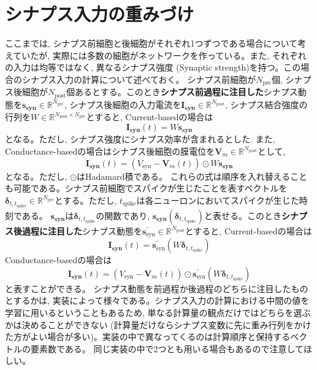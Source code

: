 \section{シナプス入力の重みづけ
}
ここまでは, シナプス前細胞と後細胞がそれぞれ1つずつである場合について考えていたが, 実際には多数の細胞がネットワークを作っている。また, それぞれの入力は均等ではなく, 異なるシナプス強度 (Synaptic strength)を持つ。この場合のシナプス入力の計算について述べておく。
シナプス前細胞が$N_{\text{pre}}$個, シナプス後細胞が$N_{\text{post}}$個あるとする。このとき\textbf{シナプス前過程に注目した}シナプス動態を$\boldsymbol{s_{\text{syn}}}\in \mathbb{R}^{N_{\text{pre}}}$, シナプス後細胞の入力電流を$\boldsymbol{I_{\text{syn}}}\in \mathbb{R}^{N_{\text{post}}}$, シナプス結合強度の行列を$W\in \mathbb{R}^{N_{\text{post}} \times N_{\text{pre}}}$とすると, Current-basedの場合は
\begin{equation}
\boldsymbol{I_{\text{syn}}}(t)=W \boldsymbol{s_{\text{syn}}}  
\end{equation}
となる。ただし, シナプス強度にシナプス効率が含まれるとした. また, Conductance-basedの場合はシナプス後細胞の膜電位を$\boldsymbol{V}_{m}\in \mathbb{R}^{N_{\text{post}}}$として, 
\begin{equation}
\boldsymbol{I_{\text{syn}}}(t)=\left(V_{\text{syn}}-\boldsymbol{V}_{m}(t)\right)\odot W \boldsymbol{s_{\text{syn}}}
\end{equation}
となる。ただし, $\odot$はHadamard積である。
これらの式は順序を入れ替えることも可能である。シナプス前細胞でスパイクが生じたことを表すベクトルを$\boldsymbol{\delta}_{t,t_{\text{spike}}}\in \mathbb{R}^{N_{\text{pre}}}$とする。ただし, $t_{\text{spike}}$は各ニューロンにおいてスパイクが生じた時刻である。 $\boldsymbol{s_{\text{syn}}}$は$\boldsymbol{\delta}_{t,t_{\text{spike}}}$の関数であり, $\boldsymbol{s_{\text{syn}}}(\boldsymbol{\delta}_{t,t_{\text{spike}}})$と表せる。このとき\textbf{シナプス後過程に注目した}シナプス動態を$\boldsymbol{s}^\prime_{\text{syn}}\in \mathbb{R}^{N_{\text{post}}}$とすると, Current-basedの場合は
\begin{equation}
\boldsymbol{I_{\text{syn}}}(t)=\boldsymbol{s}^\prime_{\text{syn}}(W\boldsymbol{\delta}_{t,t_{\text{spike}}})  
\end{equation}
Conductance-basedの場合は
\begin{equation}
\boldsymbol{I_{\text{syn}}}(t)=\left(V_{\text{syn}}-\boldsymbol{V}_{m}(t)\right)\odot \boldsymbol{s}^\prime_{\text{syn}}(W\boldsymbol{\delta}_{t,t_{\text{spike}}})
\end{equation}
と表すことができる。
シナプス動態を前過程か後過程のどちらに注目したものとするかは, 実装によって様々である。シナプス入力の計算における中間の値を学習に用いるということもあるため, 単なる計算量の観点だけではどちらを選ぶかは決めることができない (計算量だけならシナプス変数に先に重み行列をかけた方がよい場合が多い)。実装の中で異なってくるのは計算順序と保持するベクトルの要素数である。 同じ実装の中で2つとも用いる場合もあるので注意してほしい。
